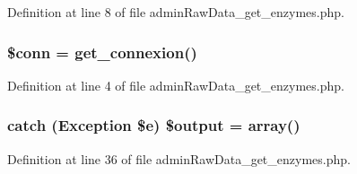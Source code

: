 Definition at line 8 of file admin\-Raw\-Data\-\_\-get\-\_\-enzymes.\-php.

\hypertarget{admin_rawdata_2admin_raw_data__get__enzymes_8php_aa8a5a87b9c1a6a0819b88447cbe41877}{
\subsubsection[{\$conn}]{\setlength{\rightskip}{0pt plus 5cm}\$conn = {\bf get\-\_\-connexion}()}}\label{admin_rawdata_2admin_raw_data__get__enzymes_8php_aa8a5a87b9c1a6a0819b88447cbe41877}


Definition at line 4 of file admin\-Raw\-Data\-\_\-get\-\_\-enzymes.\-php.

\hypertarget{admin_rawdata_2admin_raw_data__get__enzymes_8php_adeea971a3fd99fcce189bd638dacd58c}{
\subsubsection[{\$output}]{\setlength{\rightskip}{0pt plus 5cm}catch (Exception \$e) \$output = array()}}\label{admin_rawdata_2admin_raw_data__get__enzymes_8php_adeea971a3fd99fcce189bd638dacd58c}


Definition at line 36 of file admin\-Raw\-Data\-\_\-get\-\_\-enzymes.\-php.

